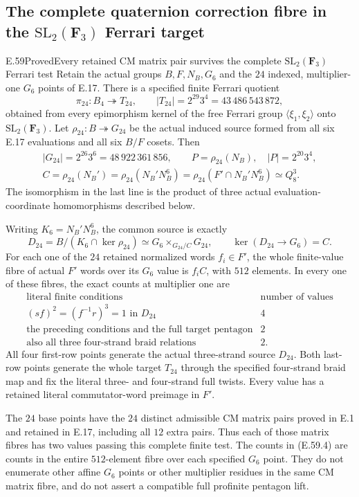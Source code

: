 \subsection{The complete quaternion correction fibre in the \texorpdfstring{$\mathrm{SL}_2(\mathbf F_3)$}{SL2(F3)} Ferrari target}

\begin{statement}{E.59}{Proved}{Every retained CM matrix pair survives the complete \texorpdfstring{$\mathrm{SL}_2(\mathbf F_3)$}{SL2(F3)} Ferrari test}
Retain the actual groups $B,F,N_B,G_6$ and the $24$ indexed,
multiplier-one $G_6$ points of E.17. There is a specified finite
Ferrari quotient
\[
 \pi_{24}:B_4\twoheadrightarrow T_{24},\qquad
 |T_{24}|=2^{29}3^4=43\,486\,543\,872,
 \tag{E.59.1}
\]
obtained from every epimorphism kernel of the free Ferrari group
$\langle\xi_1,\xi_2\rangle$ onto $\mathrm{SL}_2(\mathbf F_3)$.
Let $\rho_{24}:B\twoheadrightarrow G_{24}$ be the actual induced
source formed from all six E.17 evaluations and all six $B/F$
cosets. Then
\[
 \begin{gathered}
 |G_{24}|=2^{26}3^6=48\,922\,361\,856,\qquad
 P=\rho_{24}(N_B),\quad |P|=2^{20}3^4,\\
 C=\rho_{24}(N_B')=\rho_{24}(N_B'N_B^6)
   =\rho_{24}(F'\cap N_B'N_B^6)\simeq Q_8^3.
 \end{gathered}
 \tag{E.59.2}
\]
The isomorphism in the last line is the product of three actual
evaluation-coordinate homomorphisms described below.

Writing $K_6=N_B'N_B^6$, the common source is exactly
\[
 D_{24}=B/(K_6\cap\ker\rho_{24})
     \simeq G_6\mathbin{\times_{G_{24}/C}}G_{24},
 \qquad \ker(D_{24}\to G_6)=C.
 \tag{E.59.3}
\]
For each one of the $24$ retained normalized words $f_i\in F'$, the
whole finite-value fibre of actual $F'$ words over its $G_6$ value
is $f_iC$, with $512$ elements. In every one of these fibres,
the exact counts at multiplier one are
\[
 \begin{array}{l|r}
 \text{literal finite conditions}&\text{number of values}\\\hline
 (sf)^2=(f^{-1}r)^3=1\text{ in }D_{24}&4\\
 \text{the preceding conditions and the full target pentagon}&2\\
 \text{also all three four-strand braid relations}&2.
 \end{array}
 \tag{E.59.4}
\]
All four first-row points generate the actual three-strand source
$D_{24}$. Both last-row points generate the whole target $T_{24}$
through the specified four-strand braid map and fix the literal
three- and four-strand full twists. Every value has a
retained literal commutator-word preimage in $F'$.

The $24$ base points have the $24$ distinct admissible CM matrix
pairs proved in E.1 and retained in E.17, including all $12$ extra
pairs. Thus each of those matrix fibres has two values passing
this complete finite test. The counts in \textup{(E.59.4)} are
counts in the entire $512$-element fibre over each specified
$G_6$ point. They do not enumerate other affine $G_6$ points or
other multiplier residues in the same CM matrix fibre, and do
not assert a compatible full profinite pentagon lift.
\end{statement}

